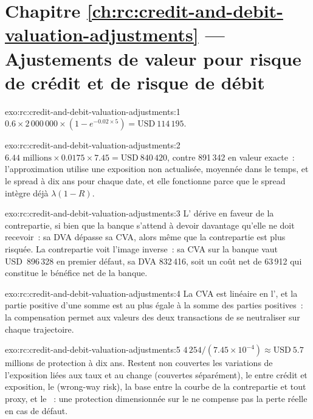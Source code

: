 \section*{Chapitre \ref{ch:rc:credit-and-debit-valuation-adjustments} --- Ajustements de valeur pour risque de crédit et de risque de débit}

\begin{solution}{exo:rc:credit-and-debit-valuation-adjustments:1}
$0.6\times2\,000\,000\times(1-e^{-0.02\times5}) = \text{USD}~114\,195$.
\end{solution}

\begin{solution}{exo:rc:credit-and-debit-valuation-adjustments:2}
$6.44\text{ millions}\times0.0175\times7.45 = \text{USD}~840\,420$, contre 891\,342 en valeur exacte~: l'approximation
utilise une exposition non actualisée, moyennée dans le temps, et le spread à dix ans pour chaque date,
et elle fonctionne parce que le spread intègre déjà $\lambda(1-R)$.
\end{solution}

\begin{solution}{exo:rc:credit-and-debit-valuation-adjustments:3}
L' dérive en faveur de la contrepartie, si bien que la banque s'attend à devoir davantage qu'elle
ne doit recevoir~: sa DVA dépasse sa CVA, alors même que la contrepartie est plus risquée. La contrepartie voit
l'image inverse~: sa CVA sur la banque vaut USD~896\,328 en premier défaut, sa DVA 832\,416, soit
un coût net de 63\,912 qui constitue le bénéfice net de la banque.
\end{solution}

\begin{solution}{exo:rc:credit-and-debit-valuation-adjustments:4}
La CVA est linéaire en l', et la partie positive d'une somme est au plus
égale à la somme des parties positives~: la compensation permet aux valeurs des deux transactions de se neutraliser sur chaque trajectoire.
\end{solution}

\begin{solution}{exo:rc:credit-and-debit-valuation-adjustments:5}
$4\,254/(7.45\times10^{-4}) \approx \text{USD}~5.7$ millions de protection à dix ans. Restent non couvertes les
variations de l'exposition liées aux taux et au change (couvertes séparément), le  entre crédit et
exposition, le  (wrong-way risk), la base entre la courbe de la contrepartie et tout proxy, et
le ~: une protection dimensionnée sur le  ne compense pas la perte réelle en cas de défaut.
\end{solution}

